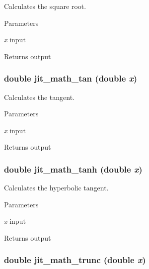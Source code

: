 Calculates the square root. 
\begin{DoxyParams}{Parameters}
\item[{\em x}]input \end{DoxyParams}
\begin{DoxyReturn}{Returns}
output 
\end{DoxyReturn}
\hypertarget{group__mathmod_gacda64129c8745558f439f72c6f00897d}{
\subsubsection[{jit\_\-math\_\-tan}]{\setlength{\rightskip}{0pt plus 5cm}double jit\_\-math\_\-tan (double {\em x})}}
\label{group__mathmod_gacda64129c8745558f439f72c6f00897d}


Calculates the tangent. 
\begin{DoxyParams}{Parameters}
\item[{\em x}]input \end{DoxyParams}
\begin{DoxyReturn}{Returns}
output 
\end{DoxyReturn}
\hypertarget{group__mathmod_ga3c089e74ef4aa2338189aee123d7e4a8}{
\subsubsection[{jit\_\-math\_\-tanh}]{\setlength{\rightskip}{0pt plus 5cm}double jit\_\-math\_\-tanh (double {\em x})}}
\label{group__mathmod_ga3c089e74ef4aa2338189aee123d7e4a8}


Calculates the hyperbolic tangent. 
\begin{DoxyParams}{Parameters}
\item[{\em x}]input \end{DoxyParams}
\begin{DoxyReturn}{Returns}
output 
\end{DoxyReturn}
\hypertarget{group__mathmod_gab6a84c39d16bc9fd8f1efbf68e696d3c}{
\subsubsection[{jit\_\-math\_\-trunc}]{\setlength{\rightskip}{0pt plus 5cm}double jit\_\-math\_\-trunc (double {\em x})}}
\label{group__mathmod_gab6a84c39d16bc9fd8f1efbf68e696d3c}


